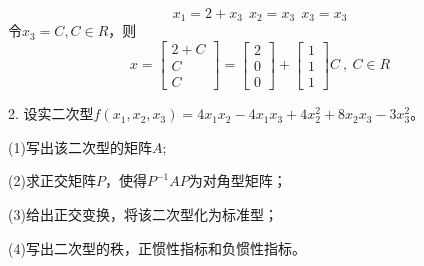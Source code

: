 \documentclass{article}
\begin{document}
\begin{jie}
\begin{equation*}
  x_{1}=2+x_{3}~~x_{2}=x_{3}~~x_{3}=x_{3}
\end{equation*}
令$x_{3}=C,C\in R$，则
\begin{equation*}
x=
 \begin{bmatrix}
   2+C \\
   C \\
   C
 \end{bmatrix}
 =
  \begin{bmatrix}
   2 \\
   0 \\
   0
 \end{bmatrix}
 +
  \begin{bmatrix}
   1 \\
   1 \\
   1
 \end{bmatrix}C
 ~,~C\in R
\end{equation*}

\end{jie}

2. 设实二次型$f(x_{1},x_{2},x_{3})=4x_{1}x_{2}-4x_{1}x_{3}+4x_{2}^{2}+8x_{2}x_{3}-3x_{3}^{2}$。

(1)写出该二次型的矩阵$A$;

(2)求正交矩阵$P$，使得$P^{-1}AP$为对角型矩阵；

(3)给出正交变换，将该二次型化为标准型；

(4)写出二次型的秩，正惯性指标和负惯性指标。
\end{document}
